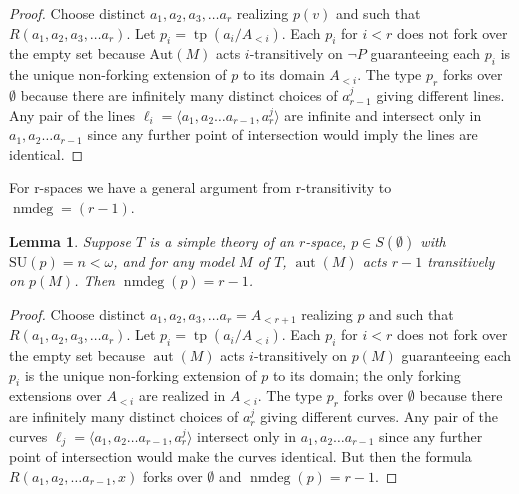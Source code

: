 \documentclass[11pt]{amsart}
\def\aut{\mathop{aut}}
\def\nmdeg{\mathop{\rm nmdeg}}
\def\nmdeg{\operatorname{nmdeg}}
\DeclareMathOperator{\tp}{tp}
\newtheorem{lemma}[theorem]{Lemma}
\theoremstyle{definition}
\theoremstyle{remark}
\numberwithin{equation}{section}
\begin{document}
\begin{proof} Choose distinct $a_1, a_2, a_3,\ldots a_r$ realizing $p(v)$ and such that $R(a_1, a_2,
a_3, \ldots a_r)$.
Let $p_i = \tp(a_i/A_{<i})$. Each $p_i$ for $i < r$ does not fork over the
empty set because  $\mathrm{Aut}(M)$ acts $i$-transitively on $\neg P$ guaranteeing
each $p_i$ is the unique non-forking extension of $p$ to its domain $A_{<i}$.
The type $p_r$ forks over $\emptyset$ because there are infinitely many
distinct choices of $a_{r-1}^j$ giving different lines. Any pair of the lines
$\ell_i = \langle a_1, a_2 \dots a_{r-1}, a^j_r \rangle$ are infinite and intersect only in
$a_1, a_2 \dots a_{r-1}$ since any further point of intersection would imply
the lines are identical.
%
\end{proof}
%


For r-spaces we have a general argument from r-transitivity to $\nmdeg =
(r-1)$.





\begin{lemma}\label{transimpnmfin} Suppose $T$ is a simple theory of an $r$-space, $p\in S(\emptyset)$
 with  $\mathrm{SU}(p) = n < \omega $, and for any model $M$ of $T$,
$\aut(M)$ acts $r-1$ transitively on $p(M)$.  Then $\nmdeg(p) =r-1$.
\end{lemma}






\begin{proof} Choose distinct $a_1, a_2, a_3,\ldots a_r = A_{<r+1}$ realizing $p$ and such that $R(a_1, a_2,
a_3, \ldots a_r)$.  Let $p_i = \tp(a_i/A_{<i})$. Each  $p_i$ for $i < r$ does
not fork over the empty set because  $\aut(M)$ acts $i$-transitively on
$p(M)$ guaranteeing each $p_i$ is the unique non-forking extension of $p$ to
its domain;
the only forking extensions over $A_{<i}$ are realized in   $A_{<i}$. 
The type $p_r$ forks over
$\emptyset$ because there are infinitely many distinct choices of $a_{r }^j$
giving different curves. Any pair of the curves $\ell_j = \langle a_1, a_2
\dots a_{r-1}, a^j_r \rangle$ intersect only in $a_1, a_2 \dots a_{r-1}$
since any further point of intersection would make  the curves identical.
 But then the formula
$R(a_1,a_2,\dots a_{r-1},x)$ forks over $\emptyset$ and $\nmdeg(p) = r-1$.
\end{proof}
\end{document}
